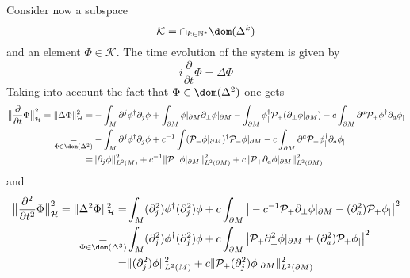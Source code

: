 Consider now a subspace
\begin{equation*}
\mathcal{K} = \cap_{k\in \mathbb{N}^*} \dom(\Delta^k)
\end{equation*}
and an element $\Phi \in \mathcal{K}$.
The time evolution of the system is given by
\begin{equation*}
i \frac{\partial }{\partial t} \Phi = \Delta \Phi 
\end{equation*}
Taking into account the fact that $\Phi\in\dom(\Delta^2)$ one gets
\begin{equation*}
\begin{split}
\big\| \frac{\partial }{\partial t} \Phi \big\|^2_\mathcal{H} = \| \Delta \Phi \|^2_{\mathcal{H}}  =
& - \int_M \partial^j \phi^\dagger \partial_j \phi 
+ \int_{\partial M}\phi\vert_{\partial M} \partial_\bot \phi\vert_{\partial M}
- \int_{\partial M} \phi_|^\dagger \mathcal{P}_+(\partial_\bot \phi\vert_{\partial M})
- c\int_{\partial M} \partial^a \mathcal{P}_+ \phi^\dagger_| \partial_a \phi_| \\
\underset{\Phi \in \dom(\Delta^2)}{=} & - \int_M \partial^j \phi^\dagger \partial_j \phi
+c^{-1}\int (\mathcal{P}_- \phi\vert_{\partial M})^\dagger \mathcal{P}_- \phi\vert_{\partial M} 
- c\int_{\partial M} \partial^a \mathcal{P}_+ \phi^\dagger_| \partial_a \phi_| \\
= & \|\partial_j \phi \|^2_{L^2 (M)} + c^{-1} \| \mathcal{P}_- \phi\vert_{\partial M} \|^2_{L^2(\partial M)}
+ c \| \mathcal{P}_+ \partial_a \phi\vert_{\partial M} \|^2_{L^2(\partial M)}
\end{split}
\end{equation*}
and
\begin{equation*}
\begin{split}
\big\| \frac{\partial^2 }{\partial t^2} \Phi \big\|^2_\mathcal{H} = 
\| \Delta^2 \Phi \|^2_{\mathcal{H}} 
= &  \int_M (\partial_j^2) \phi^\dagger (\partial_j^2) \phi
+ c \int_{\partial M} \big| -c^{-1} \mathcal{P}_+\partial_\bot \phi\vert_{\partial M} - (\partial_a^2) \mathcal{P}_+\phi_| \big|^2  \\
\underset{\Phi \in \dom(\Delta^3)}{=} & \int_M (\partial_j^2) \phi^\dagger (\partial_j^2) \phi
+ c \int_{\partial M} \big|  \mathcal{P}_+\partial^2_\bot \phi\vert_{\partial M} + (\partial_a^2) \mathcal{P}_+\phi_| \big|^2 \\
= & \|(\partial^2_j) \phi \|^2_{L^2 (M)} 
+ c \| \mathcal{P}_+ (\partial_j^2) \phi\vert_{\partial M} \|^2_{L^2(\partial M)}
\end{split}
\end{equation*}
